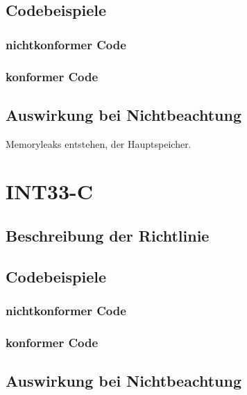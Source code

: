 \documentclass[12pt]{article}
\begin{document}
\subsection{Codebeispiele}
\subsubsection{nichtkonformer Code}
\subsubsection{konformer Code}

\subsection{Auswirkung bei Nichtbeachtung}
Memoryleaks entstehen, der Hauptspeicher.



\section{INT33-C}
\subsection{Beschreibung der Richtlinie}
\subsection{Codebeispiele}
\subsubsection{nichtkonformer Code}
\subsubsection{konformer Code}

\subsection{Auswirkung bei Nichtbeachtung}
\end{document}
